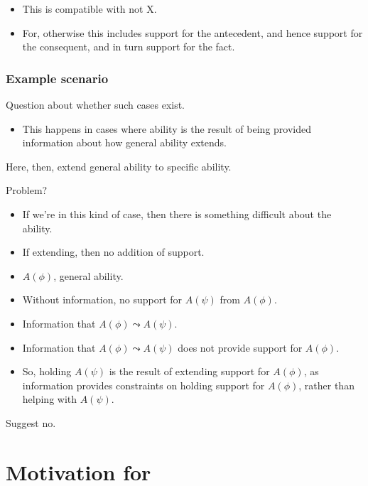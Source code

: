 \documentclass[10pt]{article}
\begin{document}
\begin{itemize}
\item This is compatible with not X.
\item For, otherwise this includes support for the antecedent, and hence support for the consequent, and in turn support for the fact.
\end{itemize}

\subsubsection{Example scenario}
\label{sec:example-cases}

Question about whether such cases exist.

\begin{itemize}
\item This happens in cases where ability is the result of being provided information about how general ability extends.
\end{itemize}

Here, then, extend general ability to specific ability.

Problem?

\begin{itemize}
\item If we're in this kind of case, then there is something difficult about the ability.
\end{itemize}

\begin{itemize}
\item If extending, then no addition of support.
\end{itemize}

\begin{itemize}
\item \(A(\phi)\), general ability.
\item Without information, no support for \(A(\psi)\) from \(A(\phi)\).
\item Information that \(A(\phi) \leadsto A(\psi)\).
\item Information that \(A(\phi) \leadsto A(\psi)\) does not provide support for \(A(\phi)\).
\item So, holding \(A(\psi)\) is the result of extending support for \(A(\phi)\), as information provides constraints on holding support for \(A(\phi)\), rather than helping with \(A(\psi)\).
\end{itemize}


Suggest no.

\section{Motivation for \nI{}}
\label{sec:motivation-ni}
\end{document}
